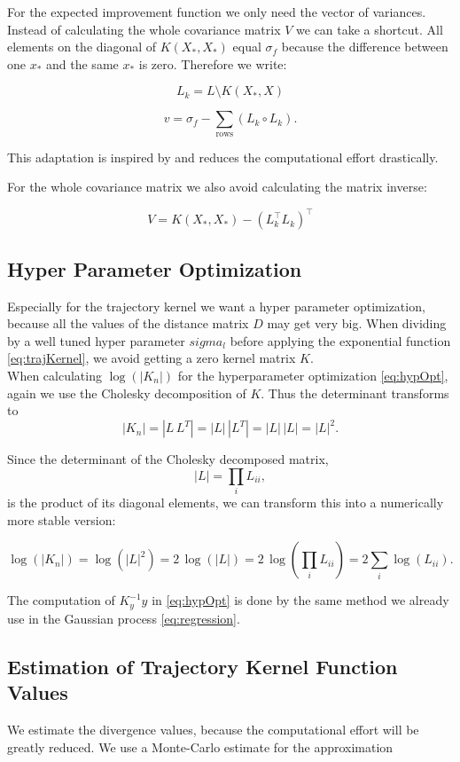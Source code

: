 For the expected improvement function we only need the vector of variances. Instead of calculating the whole covariance matrix $V$ we can take a shortcut. All elements on the diagonal of $K(X_*,X_*)$ equal $\sigma_f$ because the difference between one $x_*$ and the same $x_*$ is zero. Therefore we write:

$$L_k = L \setminus K(X_*,X)$$

$$v = \sigma_f - \sum_{\text{rows}} (L_k \circ L_k).$$

This adaptation is inspired by \cite{nandoCode} and reduces the computational effort drastically.

For the whole covariance matrix we also avoid calculating the matrix inverse:

$$V = K(X_*,X_*) - (L_k^\top L_k)^\top $$

\subsection{Hyper Parameter Optimization}
Especially for the trajectory kernel we want a hyper parameter optimization, because all the values of the distance matrix $D$ may get very big. When dividing by a well tuned hyper parameter $sigma_l$ before applying the exponential function \eqref{eq:trajKernel}, we avoid getting a zero kernel matrix $K$.\\

When calculating $\log(|K_n|)$ for the hyperparameter optimization \eqref{eq:hypOpt}, again we use the Cholesky decomposition of $K$. Thus the determinant transforms to
$$|K_n|=|L\,L^{T}|=|L|\,|L^{T}|=|L|\,|L|=|L|^{2}.$$

Since the determinant of the Cholesky decomposed matrix,
$$|L| = \textstyle\prod_{i} L_{ii},$$
is the product of its diagonal elements, we can transform this into a numerically more stable version:

$$\log(|K_n|) = \log(|L|^{2}) = 2\,\log(|L|) = 2\,\log(\textstyle\prod_{i} L_{ii}) = 2\textstyle\sum_{i} \log(L_{ii}).$$

The computation of $K_y^{-1}y$ in \eqref{eq:hypOpt} is done by the same method we already use in the Gaussian process \eqref{eq:regression}.

\subsection{Estimation of Trajectory Kernel Function Values}

We estimate the divergence values, because the computational effort will be greatly reduced\cite{wilson2014using}. We use a Monte-Carlo estimate for the approximation

